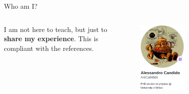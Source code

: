 \documentclass[9pt]{beamer}
\begin{document}
\begin{frame}{Who am I?}
\begin{columns}
\begin{column}{0.5\textwidth}
            I am not here to teach, but just to \textbf{share my experience}.
            This is compliant with the references.
        \end{column}
        \begin{column}{0.5\textwidth}
            \begin{figure}
                \centering
                \includegraphics[width=0.5\textwidth]{mygh}
            \end{figure}
        \end{column}
    \end{columns}
\end{frame}
\end{document}
